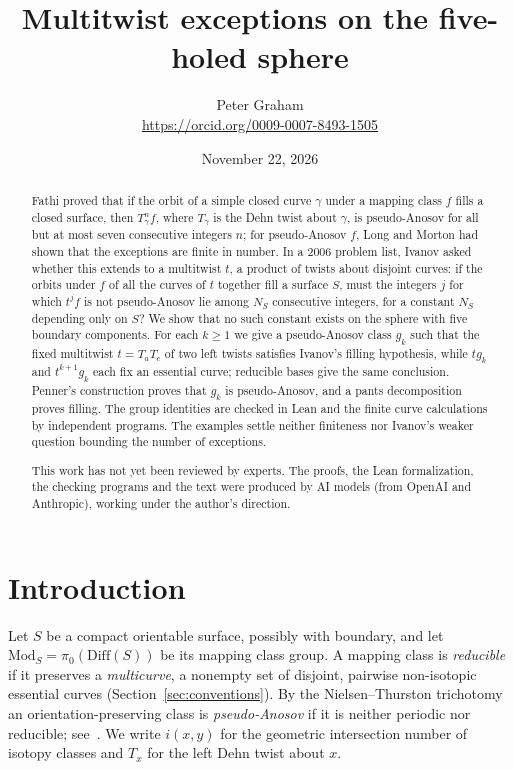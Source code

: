 \documentclass[11pt]{article}
\title{Multitwist exceptions on the five-holed sphere}
\author{Peter Graham\\ \small\url{https://orcid.org/0009-0007-8493-1505}}
\date{November 22, 2026}
\theoremstyle{remark}
\newcommand{\Mod}{\mathrm{Mod}}
\begin{document}
\maketitle
\begin{abstract}
Fathi proved that if the orbit of a simple closed curve $\gamma$ under a
mapping class $f$ fills a closed surface, then $T_\gamma^nf$, where
$T_\gamma$ is the Dehn twist about $\gamma$, is pseudo-Anosov for all but at
most seven consecutive integers $n$; for pseudo-Anosov $f$, Long and Morton
had shown that the exceptions are finite in number. In a 2006 problem
list, Ivanov asked whether this extends to a multitwist $t$, a product of twists about disjoint curves: if the
orbits under $f$ of all the curves of $t$ together fill a surface $S$, must
the integers $j$ for which $t^jf$ is not pseudo-Anosov lie among $N_S$
consecutive integers, for a constant $N_S$ depending only on $S$? We show
that no such constant exists on the sphere with five boundary components.
For each $k\ge1$ we give a pseudo-Anosov class $g_k$ such that the fixed
multitwist $t=T_aT_c$ of two left twists satisfies Ivanov's
filling hypothesis, while $tg_k$ and $t^{k+1}g_k$ each fix an essential
curve; reducible bases give the same conclusion. Penner's construction
proves that $g_k$ is pseudo-Anosov, and a pants decomposition proves
filling. The group identities are checked in Lean and the finite
curve calculations by independent programs. The examples settle neither
finiteness nor Ivanov's weaker question bounding the number of exceptions.

This work has not yet been reviewed by experts. The proofs, the Lean formalization, the checking programs and the text were produced by AI models (from OpenAI and Anthropic), working under the author's direction.
\end{abstract}
\medskip

\section{Introduction}

Let $S$ be a compact orientable surface, possibly with boundary, and let
$\Mod_S=\pi_0(\mathrm{Diff}(S))$ be its mapping class group. A mapping class is \emph{reducible} if it preserves a \emph{multicurve}, a
nonempty set of disjoint, pairwise non-isotopic essential curves
(Section~\ref{sec:conventions}). By the Nielsen--Thurston trichotomy an
orientation-preserving class is \emph{pseudo-Anosov} if it is neither
periodic nor reducible; see~\cite{FM,FLP}.
We write $i(x,y)$ for the geometric intersection number of isotopy classes
and $T_x$ for the left Dehn twist about $x$.
\end{document}
